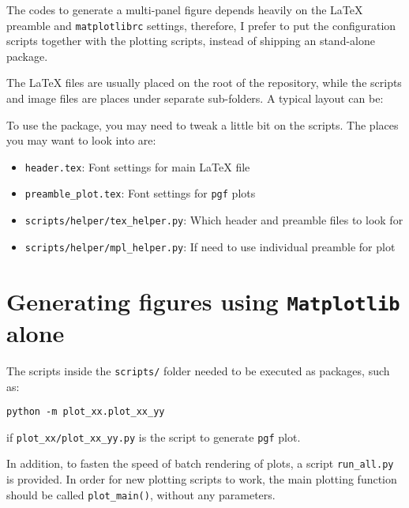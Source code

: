 The \py{} codes to generate a multi-panel figure depends heavily on
the \LaTeX{} preamble and \texttt{matplotlibrc} settings, therefore, I
prefer to put the configuration scripts together with the plotting
scripts, instead of shipping an stand-alone \py{} package.

The \LaTeX{} files are usually placed on the root of the repository,
while the \py{} scripts and image files are places under separate
sub-folders. A typical layout can be:
\vspace{1em}

To use the package, you may need to tweak a little bit on the \py{}
scripts. The places you may want to look into are:
\begin{itemize}
\item \verb|header.tex|: Font settings for main \LaTeX{} file
\item \verb|preamble_plot.tex|: Font settings for \texttt{pgf} plots
\item \verb|scripts/helper/tex_helper.py|: Which header and preamble files to look for
\item \verb|scripts/helper/mpl_helper.py|: If need to use individual preamble for \mpl{} plot
\end{itemize}

\section{Generating figures using \texttt{Matplotlib} alone}
\label{sec:matpl-only-figure}

The \py{} scripts inside the \texttt{scripts/} folder needed to be
executed as packages, such as:
\begin{verbatim}
python -m plot_xx.plot_xx_yy
\end{verbatim}
if \verb|plot_xx/plot_xx_yy.py| is the script to generate \texttt{pgf}
plot.

In addition, to fasten the speed of batch rendering of plots, a script
\verb|run_all.py| is provided. In order for new plotting scripts to
work, the main plotting function should be called \verb|plot_main()|,
without any parameters. 

